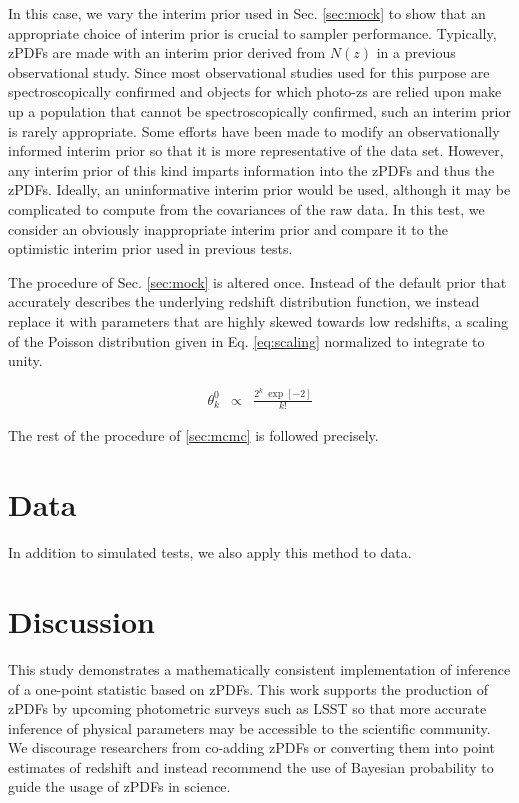 \documentclass[preprint]{aastex}
\begin{document}
In this case, we vary the interim prior used in Sec. \ref{sec:mock} to show 
that an appropriate choice of interim prior is crucial to sampler performance.  
Typically, zPDFs are made with an interim prior derived from $N(z)$ in a 
previous observational study.  Since most observational studies used for this 
purpose are spectroscopically confirmed and objects for which photo-zs are 
relied upon make up a population that cannot be spectroscopically confirmed, 
such an interim prior is rarely appropriate.  Some efforts have been made to 
modify an observationally informed interim prior so that it is more 
representative of the data set.  \citep{she11}  However, any interim prior of 
this kind imparts information into the zPDFs and thus the zPDFs.  Ideally, an 
uninformative interim prior would be used, although it may be complicated to 
compute from the covariances of the raw data.  In this test, we consider an 
obviously inappropriate interim prior and compare it to the optimistic interim 
prior used in previous tests.

The procedure of Sec. \ref{sec:mock} is altered once.  Instead of the default 
prior that accurately describes the underlying redshift distribution function, 
we instead replace it with parameters that are highly skewed towards low 
redshifts, a scaling of the Poisson distribution given in Eq. \ref{eq:scaling} 
normalized to integrate to unity.

\begin{eqnarray}
\label{eq:scaling}
\theta^{0}_{k} &\propto& \frac{2^{k}\ \exp[-2]}{k!}
\end{eqnarray}

The rest of the procedure of \ref{sec:mcmc} is followed precisely.

\clearpage
\section{Data}
\label{sec:data}

In addition to simulated tests, we also apply this method to data.

\clearpage
\section{Discussion}
\label{sec:disc}

This study demonstrates a mathematically consistent implementation of inference 
of a one-point statistic based on zPDFs.  This work supports the production of 
zPDFs by upcoming photometric surveys such as LSST so that more accurate 
inference of physical parameters may be accessible to the scientific community. 
 We discourage researchers from co-adding zPDFs or converting them into point 
estimates of redshift and instead recommend the use of Bayesian probability to 
guide the usage of zPDFs in science.
\end{document}
